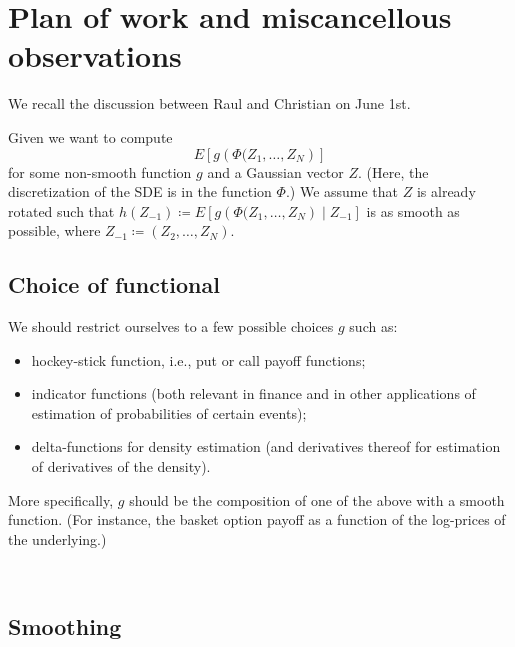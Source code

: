 \documentclass[11pt]{article}
\begin{document}
\section{Plan of work and miscancellous observations}
\label{sec:plan-work-misc}

We recall the discussion between Raul and Christian on June 1st.

Given we want to compute
\begin{equation}\label{QoI}
  E\left[ g\left( \Phi(Z_1, \ldots, Z_N \right) \right]
\end{equation}
for some non-smooth function $g$ and a Gaussian vector $Z$. (Here, the
discretization of the SDE is in the function $\Phi$.) We assume that
$Z$ is already rotated such that $h(Z_{-1}) \coloneqq E\left[ g\left(
    \Phi(Z_1, \ldots, Z_N \right) \mid Z_{-1}\right]$ is as smooth as
possible, where $Z_{-1} \coloneqq (Z_2, \ldots, Z_N)$. 

\subsection{Choice of functional}
\label{sec:choice-functional}

We should restrict ourselves to a few possible choices $g$ such as:
\begin{itemize}
\item hockey-stick function, i.e., put or call payoff functions;
\item indicator functions (both relevant in finance and in other applications
  of estimation of probabilities of certain events);
\item delta-functions for density estimation (and derivatives thereof for
  estimation of derivatives of the density).
\end{itemize}
More specifically, $g$ should be the composition of one of the above with a
smooth function. (For instance, the basket option payoff as a function of the
log-prices of the underlying.)

\

\subsection{Smoothing}
\label{sec:smoothing}
\end{document}

